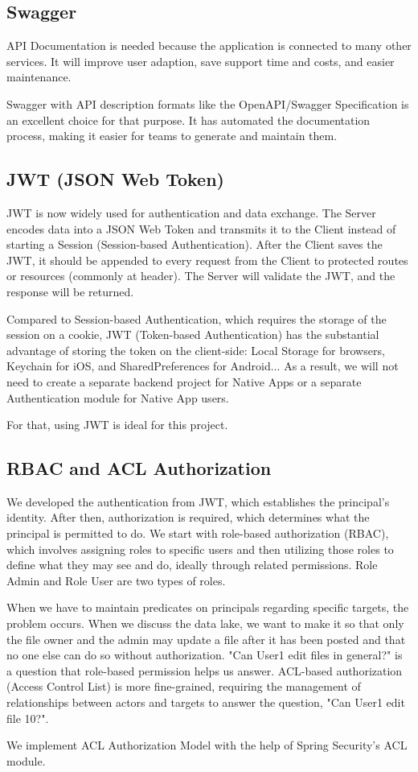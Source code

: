 \subsection{Swagger}
API Documentation is needed because the application is connected to many other services. It will improve user adaption, save support time and costs, and easier maintenance.

Swagger with API description formats like the OpenAPI/Swagger Specification is an excellent choice for that purpose. It has automated the documentation process, making it easier for teams to generate and maintain them. \cite{swagger}

\subsection{JWT (JSON Web Token)}
JWT is now widely used for authentication and data exchange. The Server encodes data into a JSON Web Token and transmits it to the Client instead of starting a Session (Session-based Authentication). After the Client saves the JWT, it should be appended to every request from the Client to protected routes or resources (commonly at header). The Server will validate the JWT, and the response will be returned.

Compared to Session-based Authentication, which requires the storage of the session on a cookie, JWT (Token-based Authentication) has the substantial advantage of storing the token on the client-side: Local Storage for browsers, Keychain for iOS, and SharedPreferences for Android... As a result, we will not need to create a separate backend project for Native Apps or a separate Authentication module for Native App users. 

For that, using JWT is ideal for this project.

\subsection{RBAC and ACL Authorization}
We developed the authentication from JWT, which establishes the principal's identity. After then, authorization is required, which determines what the principal is permitted to do. We start with role-based authorization (RBAC), which involves assigning roles to specific users and then utilizing those roles to define what they may see and do, ideally through related permissions. Role Admin and Role User are two types of roles. 

When we have to maintain predicates on principals regarding specific targets, the problem occurs. When we discuss the data lake, we want to make it so that only the file owner and the admin may update a file after it has been posted and that no one else can do so without authorization. "Can User1 edit files in general?" is a question that role-based permission helps us answer. ACL-based authorization (Access Control List) is more fine-grained, requiring the management of relationships between actors and targets to answer the question, "Can User1 edit file 10?". \cite{authorization}

We implement ACL Authorization Model with the help of Spring Security's ACL module. 